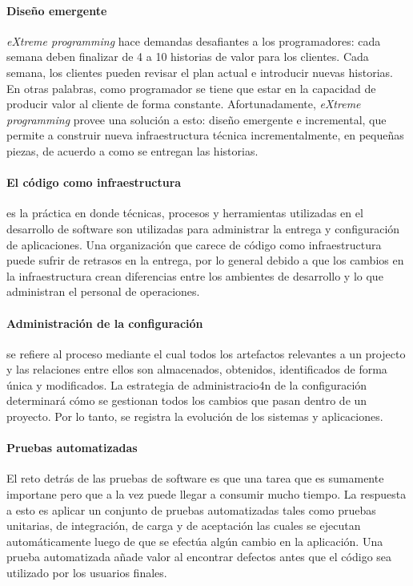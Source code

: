 \documentclass[journal]{IEEEtran}
\begin{document}
\paragraph{Diseño emergente} \emph{eXtreme programming} hace demandas desafiantes a los programadores: cada semana deben finalizar de 4 a 10 historias de valor para los clientes. Cada semana, los clientes pueden revisar el plan actual e introducir nuevas historias. En otras palabras, como programador se tiene que estar en la capacidad de producir valor al cliente de forma constante. Afortunadamente, \emph{eXtreme programming} provee una solución a esto: diseño emergente e incremental, que permite a construir nueva infraestructura técnica incrementalmente, en pequeñas piezas, de acuerdo a como se entregan las historias\cite{shore-warden}.

\paragraph{El código como infraestructura} es la práctica en donde técnicas, procesos y herramientas utilizadas en el desarrollo de software son utilizadas para administrar la entrega y configuración de aplicaciones. Una organización que carece de código como infraestructura puede sufrir de retrasos en la entrega, por lo general debido a que los cambios en la infraestructura crean diferencias entre los ambientes de desarrollo y lo que administran el personal de operaciones\cite{humble}.

\paragraph{Administración de la configuración} se refiere al proceso mediante el cual todos los artefactos relevantes a un projecto y las relaciones entre ellos son almacenados, obtenidos, identificados de forma única y modificados. La estrategia de administracio4n de la configuración determinará cómo se gestionan todos los cambios que pasan dentro de un proyecto. Por lo tanto, se registra la evolución de los sistemas y aplicaciones\cite{humble}.

\paragraph{Pruebas automatizadas} El reto detrás de las pruebas de software es que una tarea que es sumamente importane pero que a la vez puede llegar a consumir mucho tiempo. La respuesta a esto es aplicar un conjunto de pruebas automatizadas tales como pruebas unitarias, de integración, de carga y de aceptación las cuales se ejecutan automáticamente luego de que se efectúa algún cambio en la aplicación. Una prueba automatizada añade valor al encontrar defectos antes que el código sea utilizado por los usuarios finales\cite{humble}.
\end{document}
